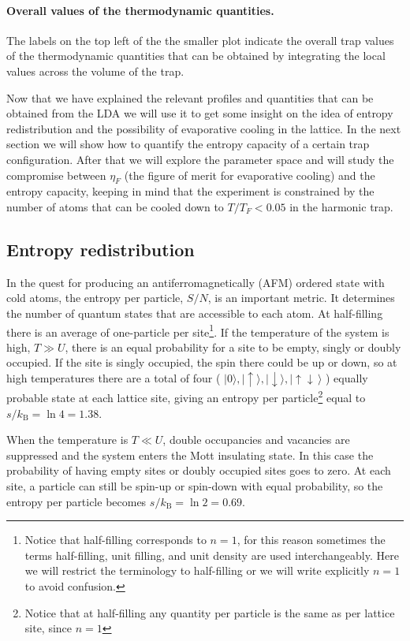 \documentclass[11pt,letter]{article}
\newcommand{\kb}{\ensuremath{k_{\text{B}}}}
\newcommand{\dbl}{\ensuremath{ \!\uparrow\! \downarrow \, }}
\newcommand{\spup}{\ensuremath{ \!\uparrow }}
\newcommand{\spdn}{\ensuremath{ \!\downarrow}}
\begin{document}
\paragraph{Overall values of the thermodynamic quantities.} The labels on the
top left of the the smaller plot indicate the overall trap values of the
thermodynamic quantities that can be obtained by integrating the local values
across the volume of the trap. 

Now that we have explained the relevant profiles and quantities that can be
obtained from the LDA we will use it to get some insight on the idea of entropy
redistribution and  the possibility of evaporative cooling in the lattice.  In
the next section we will show how to quantify the entropy capacity of a certain
trap configuration.   After that we will explore the parameter space and will
study the compromise between $\eta_{F}$ (the figure of merit for evaporative
cooling) and the entropy capacity,  keeping in mind that the experiment is
constrained by the number of atoms that can be cooled down to $T/T_{F} < 0.05 $
in the harmonic trap. 


\subsection{ Entropy redistribution }

In the quest for producing an antiferromagnetically (AFM) ordered state with
cold atoms, the entropy per particle, $S/N$,  is an important metric.  It
determines the number of quantum states that are accessible to each atom.  At
half-filling there is an average of one-particle per site\footnote{Notice that
half-filling corresponds to $n=1$, for this reason sometimes the terms
half-filling, unit filling, and unit density are used interchangeably.  Here we
will restrict the terminology to half-filling or we will write explicitly $n=1$
to avoid confusion.}.  If the temperature of the system is high, $T\gg U$,
there is an equal probability for a site to be empty, singly or doubly
occupied.  If  the site is  singly occupied, the spin there could be up or
down, so at high temperatures there are a total of four ( $|0\rangle,
|\spup\rangle, |\spdn\rangle, |\dbl\rangle$ ) equally probable state at each
lattice site, giving an entropy per particle\footnote{Notice that at
half-filling any quantity per particle is the same as per lattice site, since
$n=1$}  equal to $s/\kb=\ln 4 = 1.38$.

When the temperature is $T\ll U$, double occupancies and vacancies are suppressed
and the system enters the Mott insulating state.  In this case the probability
of having empty sites or doubly occupied sites goes to zero.   At each site, a
particle can still  be spin-up or spin-down with equal probability, so the
entropy per particle becomes $s/\kb = \ln 2 = 0.69 $.   
\end{document}
